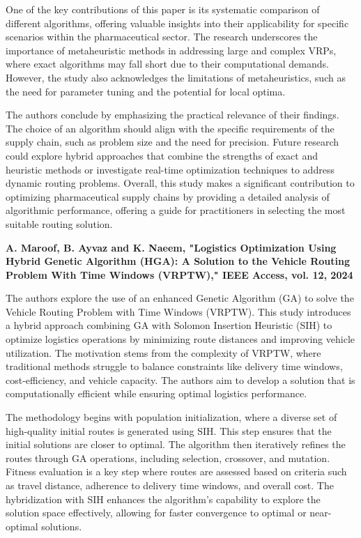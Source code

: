 One of the key contributions of this paper is its systematic comparison of different algorithms, offering valuable insights into their applicability for specific scenarios within the pharmaceutical sector. The research underscores the importance of metaheuristic methods in addressing large and complex VRPs, where exact algorithms may fall short due to their computational demands. However, the study also acknowledges the limitations of metaheuristics, such as the need for parameter tuning and the potential for local optima.

The authors conclude by emphasizing the practical relevance of their findings. The choice of an algorithm should align with the specific requirements of the supply chain, such as problem size and the need for precision. Future research could explore hybrid approaches that combine the strengths of exact and heuristic methods or investigate real-time optimization techniques to address dynamic routing problems. Overall, this study makes a significant contribution to optimizing pharmaceutical supply chains by providing a detailed analysis of algorithmic performance, offering a guide for practitioners in selecting the most suitable routing solution.

\textbf{\cite{maroof2024hybridgenetic} A. Maroof, B. Ayvaz and K. Naeem, "Logistics Optimization Using Hybrid Genetic Algorithm (HGA): A Solution to the Vehicle Routing Problem With Time Windows (VRPTW)," IEEE Access, vol. 12, 2024}

The authors explore the use of an enhanced Genetic Algorithm (GA) to solve the Vehicle Routing Problem with Time Windows (VRPTW). This study introduces a hybrid approach combining GA with Solomon Insertion Heuristic (SIH) to optimize logistics operations by minimizing route distances and improving vehicle utilization. The motivation stems from the complexity of VRPTW, where traditional methods struggle to balance constraints like delivery time windows, cost-efficiency, and vehicle capacity. The authors aim to develop a solution that is computationally efficient while ensuring optimal logistics performance.

The methodology begins with population initialization, where a diverse set of high-quality initial routes is generated using SIH. This step ensures that the initial solutions are closer to optimal. The algorithm then iteratively refines the routes through GA operations, including selection, crossover, and mutation. Fitness evaluation is a key step where routes are assessed based on criteria such as travel distance, adherence to delivery time windows, and overall cost. The hybridization with SIH enhances the algorithm's capability to explore the solution space effectively, allowing for faster convergence to optimal or near-optimal solutions.


